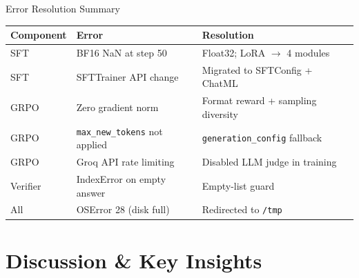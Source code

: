\documentclass[10pt]{beamer}
\begin{document}
\begin{frame}{Error Resolution Summary}
\begin{center}
\footnotesize
\begin{tabular}{lll}
    \toprule
    \textbf{Component} & \textbf{Error} & \textbf{Resolution} \\
    \midrule
    SFT & BF16 NaN at step 50 & Float32; LoRA $\to$ 4 modules \\
    SFT & SFTTrainer API change & Migrated to SFTConfig + ChatML \\
    GRPO & Zero gradient norm & Format reward + sampling diversity \\
    GRPO & \texttt{max\_new\_tokens} not applied & \texttt{generation\_config} fallback \\
    GRPO & Groq API rate limiting & Disabled LLM judge in training \\
    Verifier & IndexError on empty answer & Empty-list guard \\
    All & OSError 28 (disk full) & Redirected to \texttt{/tmp} \\
    \bottomrule
\end{tabular}
\end{center}
\end{frame}

\section{Discussion \& Key Insights}
\end{document}
